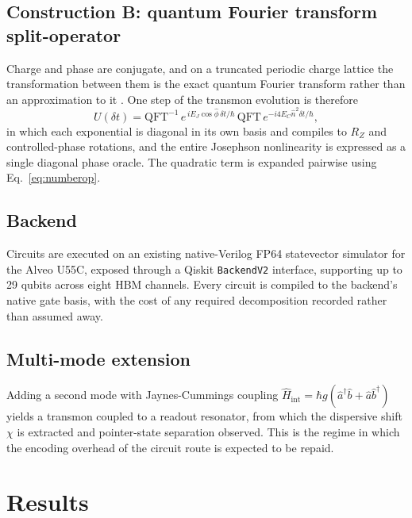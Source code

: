 \documentclass[smallextended]{svjour3}
\begin{document}
\subsection{Construction B: quantum Fourier transform split-operator}

Charge and phase are conjugate, and on a truncated periodic charge lattice the
transformation between them is the exact quantum Fourier transform rather than an
approximation to it \cite{wiesner1996, zalka1998}. One step of the transmon evolution is
therefore
\begin{equation}
U(\delta t) =
\mathrm{QFT}^{-1}\,
e^{\,i E_J \cos\hat{\phi}\,\delta t/\hbar}\,
\mathrm{QFT}\,
e^{-i 4 E_C \hat{n}^2 \delta t/\hbar},
\label{eq:splitop}
\end{equation}
in which each exponential is diagonal in its own basis and compiles to $R_Z$ and
controlled-phase rotations, and the entire Josephson nonlinearity is expressed as a
single diagonal phase oracle. The quadratic term is expanded pairwise using
Eq.~\eqref{eq:numberop}.

\subsection{Backend}

Circuits are executed on an existing native-Verilog FP64 statevector simulator for the
Alveo U55C, exposed through a Qiskit \texttt{BackendV2} interface, supporting up to
29 qubits across eight HBM channels. Every circuit is compiled to the backend's native
gate basis, with the cost of any required decomposition recorded rather than assumed
away.

\subsection{Multi-mode extension}

Adding a second mode with Jaynes-Cummings coupling
$\hat{H}_{\text{int}} = \hbar g(\hat{a}^\dagger\hat{b} + \hat{a}\hat{b}^\dagger)$
yields a transmon coupled to a readout resonator, from which the dispersive shift $\chi$
is extracted and pointer-state separation observed. This is the regime in which the
encoding overhead of the circuit route is expected to be repaid.

\section{Results}
\label{sec:results}
\end{document}
